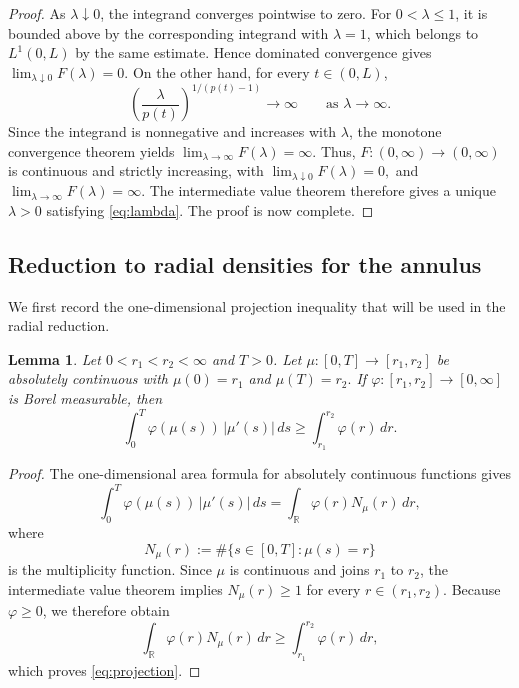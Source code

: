 \documentclass[12pt]{amsart}
\numberwithin{equation}{section}
\theoremstyle{plain}
\newtheorem{lemma}[equation]{Lemma}
\theoremstyle{definition}
\begin{document}
\begin{proof}
As $\lambda\downarrow0$, the integrand converges pointwise to zero.
For $0<\lambda\le1$, it is bounded above by the corresponding
integrand with $\lambda=1$, which belongs to $L^1(0,L)$ by the same
estimate. Hence dominated convergence gives
$\lim_{\lambda\downarrow0}F(\lambda)=0.$
On the other hand, for every $t\in(0,L)$,
\begin{equation*}
\left(
\frac{\lambda}{p(t)}
\right)^{1/(p(t)-1)}
\longrightarrow\infty
\qquad\text{as }\lambda\to\infty.
\end{equation*}
Since the integrand is nonnegative and increases with $\lambda$, the
monotone convergence theorem yields
$\lim_{\lambda\to\infty}F(\lambda)=\infty.$
Thus, $F:(0,\infty)\to(0,\infty)$ is continuous and strictly increasing,
with $\lim_{\lambda\downarrow0}F(\lambda)=0,$ and $\lim_{\lambda\to\infty}F(\lambda)=\infty.$
The intermediate value theorem therefore gives a unique
$\lambda>0$ satisfying \eqref{eq:lambda}. The proof is now complete.
\end{proof}



\subsection{Reduction to radial densities for the annulus}
\label{sec:annulus}

We first record the one-dimensional projection inequality that will be
used in the radial reduction.

\begin{lemma}
\label{lem:projection}
Let $0<r_1<r_2<\infty$ and $T>0$. Let $\mu:[0,T]\longrightarrow[r_1,r_2]$
be absolutely continuous with $\mu(0)=r_1$ and $\mu(T)=r_2.$
If $\varphi:[r_1,r_2]\to[0,\infty]$ is Borel measurable, then
\begin{equation}
\label{eq:projection}
\int_0^T
\varphi(\mu(s))\,|\mu'(s)|\,ds
\ge
\int_{r_1}^{r_2}\varphi(r)\,dr.
\end{equation}
\end{lemma}

\begin{proof}
The one-dimensional area formula for absolutely continuous functions
gives
\begin{equation*}
\int_0^T
\varphi(\mu(s))\,|\mu'(s)|\,ds
=
\int_{\mathbb R}
\varphi(r)N_\mu(r)\,dr,
\end{equation*}
where
\begin{equation*}
N_\mu(r)
:=
\#\{s\in[0,T]:\mu(s)=r\}
\end{equation*}
is the multiplicity function. Since $\mu$ is continuous and joins
$r_1$ to $r_2$, the intermediate value theorem implies $N_\mu(r)\ge1$
 for every $r\in(r_1,r_2)$.
Because $\varphi\ge0$, we therefore obtain
\begin{equation*}
\int_{\mathbb R}
\varphi(r)N_\mu(r)\,dr
\ge
\int_{r_1}^{r_2}\varphi(r)\,dr,
\end{equation*}
which proves \eqref{eq:projection}.
\end{proof}
\end{document}
